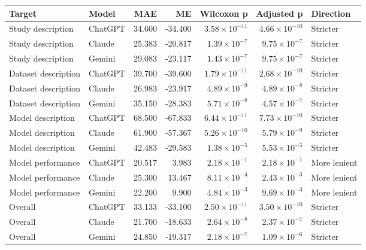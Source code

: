 \begin{tabular}{llrrrrl}
\hline
\textbf{Target} & \textbf{Model} & \textbf{MAE} & \textbf{ME} & \textbf{Wilcoxon p} & \textbf{Adjusted p} & \textbf{Direction} \\
\hline
Study description & ChatGPT & 34.600 & -34.400 & $3.58 \times 10^{-11}$ & $4.66 \times 10^{-10}$ & Stricter \\
Study description & Claude & 25.383 & -20.817 & $1.39 \times 10^{-7}$ & $9.75 \times 10^{-7}$ & Stricter \\
Study description & Gemini & 29.083 & -23.117 & $1.43 \times 10^{-7}$ & $9.75 \times 10^{-7}$ & Stricter \\
\hline
Dataset description & ChatGPT & 39.700 & -39.600 & $1.79 \times 10^{-11}$ & $2.68 \times 10^{-10}$ & Stricter \\
Dataset description & Claude & 26.983 & -23.917 & $4.89 \times 10^{-9}$ & $4.89 \times 10^{-8}$ & Stricter \\
Dataset description & Gemini & 35.150 & -28.383 & $5.71 \times 10^{-8}$ & $4.57 \times 10^{-7}$ & Stricter \\
\hline
Model description & ChatGPT & 68.500 & -67.833 & $6.44 \times 10^{-11}$ & $7.73 \times 10^{-10}$ & Stricter \\
Model description & Claude & 61.900 & -57.367 & $5.26 \times 10^{-10}$ & $5.79 \times 10^{-9}$ & Stricter \\
Model description & Gemini & 42.483 & -29.583 & $1.38 \times 10^{-5}$ & $5.53 \times 10^{-5}$ & Stricter \\
\hline
Model performance & ChatGPT & 20.517 & 3.983 & $2.18 \times 10^{-1}$ & $2.18 \times 10^{-1}$ & More lenient \\
Model performance & Claude & 25.300 & 13.467 & $8.11 \times 10^{-4}$ & $2.43 \times 10^{-3}$ & More lenient \\
Model performance & Gemini & 22.200 & 9.900 & $4.84 \times 10^{-3}$ & $9.69 \times 10^{-3}$ & More lenient \\
\hline
Overall & ChatGPT & 33.133 & -33.100 & $2.50 \times 10^{-11}$ & $3.50 \times 10^{-10}$ & Stricter \\
Overall & Claude & 21.700 & -18.633 & $2.64 \times 10^{-8}$ & $2.37 \times 10^{-7}$ & Stricter \\
Overall & Gemini & 24.850 & -19.317 & $2.18 \times 10^{-7}$ & $1.09 \times 10^{-6}$ & Stricter \\
\hline
\end{tabular}

